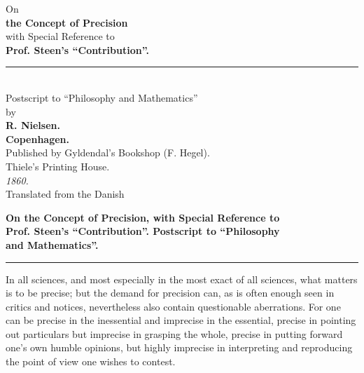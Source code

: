 \documentclass[12pt,a4paper,openany]{book}
\newcommand{\opage}[1]{\marginnote{\footnotesize\textit{[#1]}}}
\begin{document}
\begin{titlepage}
\begin{center}
\vspace*{3em}
{\large On}\\[1em]
{\Huge\textbf{the Concept of Precision}}\\[1em]
{\small with Special Reference to}\\[1em]
{\Large\textbf{Prof. Steen's ``Contribution''.}}\\[1.5em]
\rule{4em}{0.4pt}\\[1.5em]
{\small Postscript to ``Philosophy and Mathematics''}\\[0.8em]
{\small by}\\[0.8em]
{\large\textbf{R. Nielsen.}}\\[5em]
{\small\textbf{Copenhagen.}}\\[0.5em]
{\small Published by Gyldendal's Bookshop (F. Hegel).}\\[0.5em]
{\footnotesize Thiele's Printing House.}\\[0.5em]
\textit{1860.}\\[3em]
{\small Translated from the Danish}
\end{center}
\end{titlepage}

\opage{3}\setcounter{footnote}{0}%

\begin{center}\textbf{On the Concept of Precision, with Special Reference to}\\
\textbf{Prof. Steen's ``Contribution''. Postscript to ``Philosophy}\\
\textbf{and Mathematics''.}\end{center}

\begin{center}\rule{3em}{0.4pt}\end{center}

In all sciences, and most especially in the most exact
of all sciences, what matters is to be precise; but
the demand for precision can, as is often enough seen in critics
and notices, nevertheless also contain questionable aberrations. For one can be precise in the inessential and imprecise in the essential, precise in pointing out
particulars but imprecise in grasping the whole, precise
in putting forward one's own humble opinions, but highly
imprecise in interpreting and reproducing the point of view one wishes to
contest.
\end{document}
